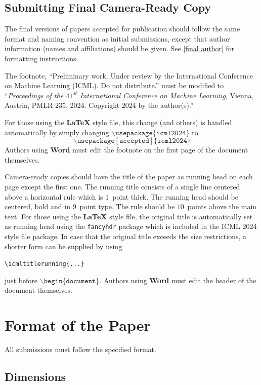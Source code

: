 \documentclass{article}
\theoremstyle{plain}
\theoremstyle{definition}
\theoremstyle{remark}
\begin{document}
\subsection{Submitting Final Camera-Ready Copy}

The final versions of papers accepted for publication should follow the
same format and naming convention as initial submissions, except that
author information (names and affiliations) should be given. See
\cref{final author} for formatting instructions.

The footnote, ``Preliminary work. Under review by the International
Conference on Machine Learning (ICML). Do not distribute.'' must be
modified to ``\textit{Proceedings of the
$\mathit{41}^{st}$ International Conference on Machine Learning},
Vienna, Austria, PMLR 235, 2024.
Copyright 2024 by the author(s).''

For those using the \textbf{\LaTeX} style file, this change (and others) is
handled automatically by simply changing
$\mathtt{\backslash usepackage\{icml2024\}}$ to
$$\mathtt{\backslash usepackage[accepted]\{icml2024\}}$$
Authors using \textbf{Word} must edit the
footnote on the first page of the document themselves.

Camera-ready copies should have the title of the paper as running head
on each page except the first one. The running title consists of a
single line centered above a horizontal rule which is $1$~point thick.
The running head should be centered, bold and in $9$~point type. The
rule should be $10$~points above the main text. For those using the
\textbf{\LaTeX} style file, the original title is automatically set as running
head using the \texttt{fancyhdr} package which is included in the ICML
2024 style file package. In case that the original title exceeds the
size restrictions, a shorter form can be supplied by using

\verb|\icmltitlerunning{...}|

just before $\mathtt{\backslash begin\{document\}}$.
Authors using \textbf{Word} must edit the header of the document themselves.

\section{Format of the Paper}

All submissions must follow the specified format.

\subsection{Dimensions}
\end{document}
